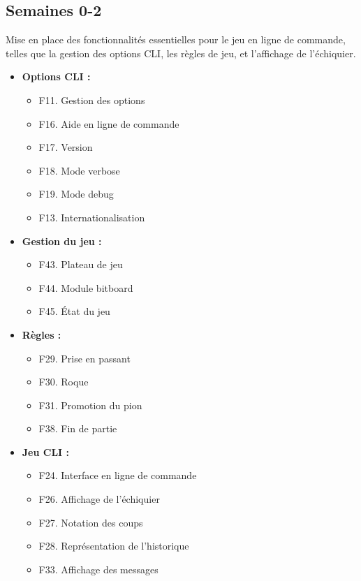 \documentclass{article}
\begin{document}
\subsection{Semaines 0-2}

Mise en place des fonctionnalités essentielles pour le jeu en ligne de commande, telles que la gestion des options CLI, les règles de jeu, et l'affichage de l'échiquier.

\begin{itemize}
    \item \textbf{Options CLI :}
    \begin{itemize}
        \item F11. Gestion des options
        \item F16. Aide en ligne de commande
        \item F17. Version
        \item F18. Mode verbose
        \item F19. Mode debug
        \item F13. Internationalisation
    \end{itemize}
    \item \textbf{Gestion du jeu :}
    \begin{itemize}
        \item F43. Plateau de jeu
        \item F44. Module bitboard
        \item F45. État du jeu
    \end{itemize}
    \item \textbf{Règles :}
    \begin{itemize}
        \item F29. Prise en passant
        \item F30. Roque
        \item F31. Promotion du pion
        \item F38. Fin de partie
    \end{itemize}
    \item \textbf{Jeu CLI :}
    \begin{itemize}
        \item F24. Interface en ligne de commande
        \item F26. Affichage de l'échiquier
        \item F27. Notation des coups
        \item F28. Représentation de l'historique
        \item F33. Affichage des messages
    \end{itemize}
\end{itemize}
\end{document}
